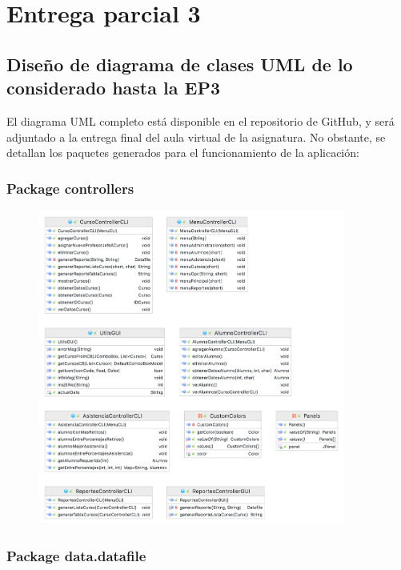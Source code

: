 \section{Entrega parcial 3}

\subsection{Diseño de diagrama de clases UML de lo considerado hasta la EP3}

El diagrama UML completo está disponible en el repositorio de GitHub, y será adjuntado a la entrega final del aula virtual de la asignatura. No obstante, se detallan los paquetes generados para el funcionamiento de la aplicación:

\subsubsection*{Package controllers}

\begin{figure}[h]
    \centering
    \includegraphics[width=0.9\textwidth]{contents/img/paq/controllers}
\end{figure}

\clearpage

\subsubsection*{Package data.datafile}

